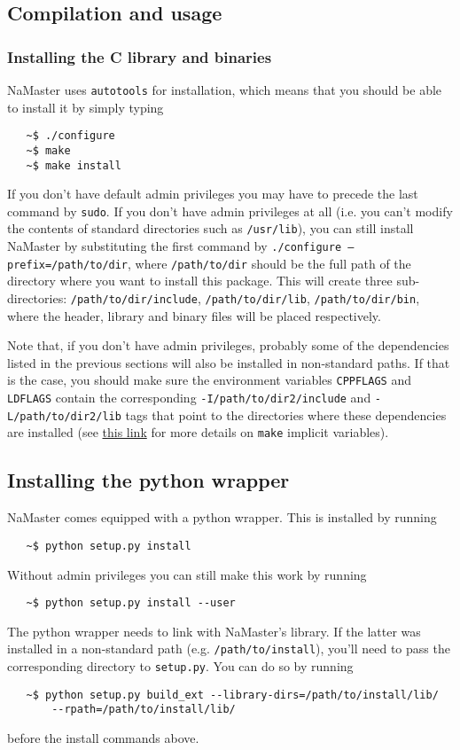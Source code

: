 \documentclass[a4paper,10pt]{article}
\begin{document}
\subsection{Compilation and usage}
\subsubsection*{Installing the C library and binaries}
NaMaster uses {\tt autotools} for installation, which means that you should be able to install it by simply typing
\begin{verbatim}
   ~$ ./configure
   ~$ make
   ~$ make install
\end{verbatim}
If you don't have default admin privileges you may have to precede the last command by {\tt sudo}. If you don't have admin privileges at all (i.e. you can't modify the contents of standard directories such as {\tt /usr/lib}), you can still install NaMaster by substituting the first command by {\tt ./configure --prefix=/path/to/dir}, where {\tt /path/to/dir} should be the full path of the directory where you want to install this package. This will create three sub-directories: {\tt /path/to/dir/include}, {\tt /path/to/dir/lib}, {\tt /path/to/dir/bin}, where the header, library and binary files will be placed respectively.

Note that, if you don't have admin privileges, probably some of the dependencies listed in the previous sections will also be installed in non-standard paths. If that is the case, you should make sure the environment variables {\tt CPPFLAGS} and {\tt LDFLAGS} contain the corresponding {\tt -I/path/to/dir2/include} and {\tt -L/path/to/dir2/lib} tags that point to the directories where these dependencies are installed (see \href{https://www.gnu.org/software/make/manual/html_node/Implicit-Variables.html}{this link} for more details on {\tt make} implicit variables).

\subsection*{Installing the python wrapper}
NaMaster comes equipped with a python wrapper. This is installed by running
\begin{verbatim}
   ~$ python setup.py install
\end{verbatim}
Without admin privileges you can still make this work by running
\begin{verbatim}
   ~$ python setup.py install --user
\end{verbatim}
The python wrapper needs to link with NaMaster's library. If the latter was installed in a non-standard path (e.g. {\tt /path/to/install}), you'll need to pass the corresponding directory to {\tt setup.py}. You can do so by running
\begin{verbatim}
   ~$ python setup.py build_ext --library-dirs=/path/to/install/lib/
       --rpath=/path/to/install/lib/
\end{verbatim}
before the install commands above.
\end{document}
